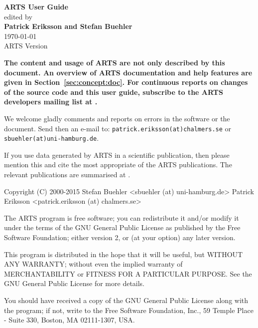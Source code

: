\documentclass[11pt,twoside,a4paper,fleqn]{book}
\begin{document}
%
\renewcommand{\thepage}{title \arabic{page}} 

\thispagestyle{plain}
\begin{center}
  \vspace*{1cm}
  {\Huge \bf ARTS User Guide\\}
  \vspace*{1cm}
  {\large edited by \\}
  \vspace*{1cm}
  {\Large \bf Patrick Eriksson and Stefan Buehler }\\
   \vspace*{2cm}
   {\large \today\\
    ARTS Version 
   }
\end{center}
\vspace*{\fill}
{\normalsize \bf
  \noindent
  The content and usage of ARTS are not only described by this
  document. An overview of ARTS documentation and help features are
  given in Section~\ref{sec:concept:doc}. For continuous reports on
  changes of the source code and this user guide, subscribe to the
  ARTS developers mailing list at .

  We welcome gladly comments and reports on errors in the software or the
  document. Send then an e-mail to: \verb|patrick.eriksson(at)chalmers.se| or
  \verb|sbuehler(at)uni-hamburg.de|.

  If you use data generated by ARTS in a scientific publication, then please
  mention this and cite the most appropriate of the ARTS publications. The
  relevant publications are summarised at
  . }

\newpage                          
\thispagestyle{empty}
\vspace*{\fill}
\noindent
\begin{code}
Copyright (C) 2000-2015
Stefan Buehler <sbuehler (at) uni-hamburg.de>
Patrick Eriksson <patrick.eriksson (at) chalmers.se>

The ARTS program is free software; you can redistribute it
and/or modify it under the terms of the GNU General Public
License as published by the Free Software Foundation; either
version 2, or (at your option) any later version.

This program is distributed in the hope that it will be
useful, but WITHOUT ANY WARRANTY; without even the implied
warranty of MERCHANTABILITY or FITNESS FOR A PARTICULAR
PURPOSE. See the GNU General Public License for more
details. 

You should have received a copy of the GNU General Public
License along with the program; if not, write to the Free
Software Foundation, Inc., 59 Temple Place - Suite 330,
Boston, MA 02111-1307, USA. 
\end{code}
\end{document}
